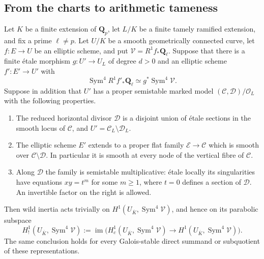 \subsection{From the charts to arithmetic tameness}

\begin{lemma}
\label{p2:lem:p2-log-bridge}
Let $K$ be a finite extension of $\mathbf Q_p$, let $L/K$ be a finite
 tamely ramified extension, and fix a prime $\ell\ne p$.  Let $U/K$ be
 a smooth geometrically connected curve, let $f:E\to U$ be an elliptic
 scheme, and put $\mathcal V=R^1f_*\mathbf Q_\ell$.
Suppose that there is a finite \'etale morphism $g:U'\to U_L$ of degree
 $d>0$ and an elliptic scheme $f':E'\to U'$ with
\[
 \operatorname{Sym}^4R^1f'_*\mathbf Q_\ell
   \simeq g^*\operatorname{Sym}^4\mathcal V.
\]
Suppose in addition that $U'$ has a proper semistable marked model
 $(\mathcal C,\mathcal D)/\mathcal O_L$ with the following properties.
\begin{enumerate}
\item The reduced horizontal divisor $\mathcal D$ is a disjoint union
 of \'etale sections in the smooth locus of $\mathcal C$, and
 $U'=\mathcal C_L\setminus\mathcal D_L$.
\item The elliptic scheme $E'$ extends to a proper flat family
 $\mathcal E\to\mathcal C$ which is smooth over
 $\mathcal C\setminus\mathcal D$.  In particular it is smooth at
 every node of the vertical fibre of $\mathcal C$.
\item Along $\mathcal D$ the family is semistable multiplicative:
 \'etale locally its singularities have equations
 $xy=t^m$ for some $m\ge1$, where $t=0$ defines a section of
 $\mathcal D$.  An invertible factor on the right is allowed.
\end{enumerate}
Then wild inertia acts trivially on
 $H^1(U_{\overline K},\operatorname{Sym}^4\mathcal V)$, and hence
 on its parabolic subspace
\[
 H^1_!(U_{\overline K},\operatorname{Sym}^4\mathcal V)
 :=\operatorname{im}\bigl(H^1_c(U_{\overline K},
 \operatorname{Sym}^4\mathcal V)\longrightarrow
 H^1(U_{\overline K},\operatorname{Sym}^4\mathcal V)\bigr).
\]
The same conclusion holds for every Galois-stable direct summand or
 subquotient of these representations.
\end{lemma}

